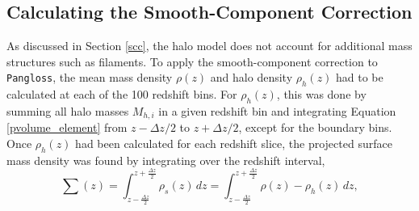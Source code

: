 \documentclass[%
 reprint,
 amsmath,amssymb,
 aps,nofootinbib
]{revtex4-1}
\begin{document}


\subsection{Calculating the Smooth-Component Correction} \label{calc_scc}


As discussed in Section \ref{scc}, the halo model does not account for additional mass structures such as filaments. To apply the smooth-component correction to \texttt{Pangloss}, the mean mass density $\rho(z)$ and halo density $\rho_h(z)$ had to be calculated at each of the 100 redshift bins. For $\rho_h(z)$, this was done by summing all halo masses $M_{h,i}$ in a given redshift bin and integrating Equation \eqref{pvolume_element} from ${z-\Delta z/2}$ to ${z+\Delta z/2}$, except for the boundary bins. Once $\rho_h(z)$ had been calculated for each redshift slice, the projected surface mass density was found by integrating over the redshift interval,
\begin{equation}\label{surface_density} 
\sum(z)=\int_{z-\frac{\Delta z}{2}}^{z+\frac{\Delta z}{2}} \rho_s(z)\,dz=\int_{z-\frac{\Delta z}{2}}^{z+\frac{\Delta z}{2}} \rho(z)-\rho_h(z)\,dz,
\end{equation}
\end{document}
